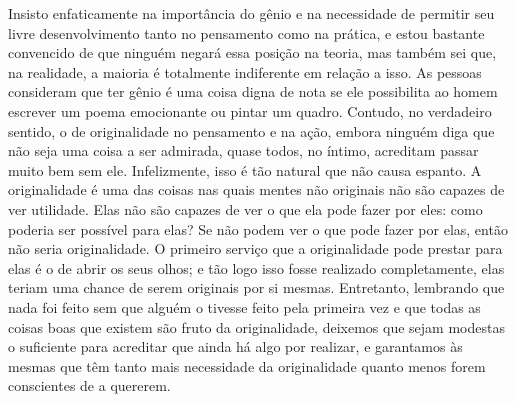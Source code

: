 Insisto enfaticamente na importância do gênio e na necessidade de
permitir seu livre desenvolvimento tanto no pensamento como na
prática, e estou bastante \mbox{convencido} de que ninguém negará essa posição
na teoria, mas também sei que, na realidade, a maioria é totalmente
indiferente em relação a isso. As pessoas consideram que ter gênio é
uma coisa digna de nota se ele possibilita ao homem escrever um poema
emocionante ou pintar um quadro. Contudo, no verdadeiro sentido, o de
originalidade no pensamento e na ação, embora ninguém diga que não seja
uma coisa a ser admirada, quase todos, no íntimo, acreditam passar
muito bem sem ele. Infelizmente, isso é tão natural que não causa
espanto. A originalidade é uma das coisas nas quais mentes não
originais não são capazes de ver utilidade. Elas não são capazes de ver
o que ela pode fazer por eles: como poderia ser possível para elas? Se
não podem ver o que pode fazer por elas, então não seria originalidade.
O primeiro serviço que a originalidade pode prestar para elas é o de
abrir os seus olhos; e tão logo isso fosse realizado completamente,
elas teriam uma chance de serem originais por si mesmas. Entretanto,
lembrando que nada foi feito sem que alguém o tivesse feito pela
primeira vez e que todas as coisas boas que existem são fruto da
originalidade, deixemos que sejam modestas o suficiente para acreditar
que ainda há algo por realizar, e garantamos às mesmas que têm tanto
mais necessidade da originalidade quanto menos forem conscientes de a
quererem.

